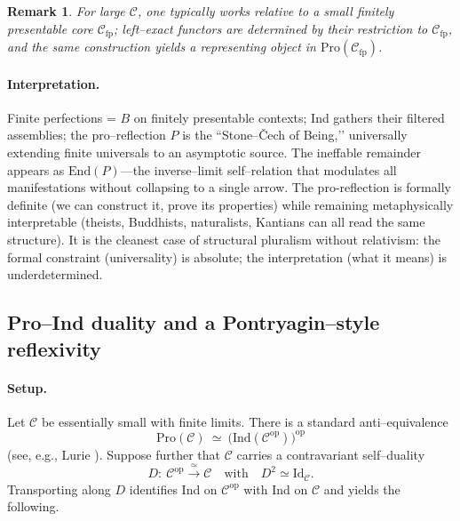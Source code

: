 \documentclass[11pt]{article}
\theoremstyle{upright}
\newtheorem{remark}{Remark}
\begin{document}
\begin{infobox}[title={The Stone–Čech of Being}]
\begin{remark}
For large $\mathcal C$, one typically works relative to a small finitely presentable core $\mathcal C_{\mathrm{fp}}$; left–exact functors are determined by their restriction to $\mathcal C_{\mathrm{fp}}$, and the same construction yields a representing object in $\mathrm{Pro}(\mathcal C_{\mathrm{fp}})$.
\end{remark}

\paragraph{Interpretation.}
Finite perfections = $B$ on finitely presentable contexts; Ind gathers their filtered assemblies; the pro–reflection $P$ is the “Stone–Čech of Being,’’ universally extending finite universals to an asymptotic source. The ineffable remainder appears as $\mathrm{End}(P)$—the inverse–limit self–relation that modulates all manifestations without collapsing to a single arrow.
The pro-reflection is formally definite (we can construct it, prove its properties) while remaining metaphysically interpretable (theists, Buddhists, naturalists, Kantians can all read the same structure). It is the cleanest case of structural pluralism without relativism: the formal constraint (universality) is absolute; the interpretation (what it means) is underdetermined.
\end{infobox}

\subsection{Pro–Ind duality and a Pontryagin–style reflexivity}\label{subsec:pro-ind-duality}

\paragraph{Setup.}
Let $\mathcal C$ be essentially small with finite limits. There is a standard anti–equivalence
\[
\mathrm{Pro}(\mathcal C)\ \simeq\ \big(\mathrm{Ind}(\mathcal C^{\mathrm{op}})\big)^{\mathrm{op}}
\]
(see, e.g., Lurie \cite{Lurie2018ProObjects}). Suppose further that $\mathcal C$ carries a contravariant self–duality
\[
D:\ \mathcal C^{\mathrm{op}}\xrightarrow{\ \simeq\ }\mathcal C
\quad\text{with}\quad D^2\simeq \mathrm{Id}_{\mathcal C}.
\]
Transporting along $D$ identifies Ind on $\mathcal C^{\mathrm{op}}$ with Ind on $\mathcal C$ and yields the following.
\end{document}
